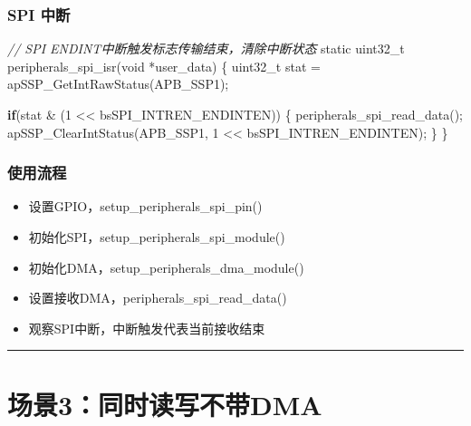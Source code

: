 \documentclass[
  12pt,
]{book}
\newenvironment{Shaded}{\begin{snugshade}}{\end{snugshade}}
\newcommand{\CommentTok}[1]{\textcolor[rgb]{0.56,0.35,0.01}{\textit{#1}}}
\newcommand{\ControlFlowTok}[1]{\textcolor[rgb]{0.13,0.29,0.53}{\textbf{#1}}}
\newcommand{\DataTypeTok}[1]{\textcolor[rgb]{0.13,0.29,0.53}{#1}}
\newcommand{\DecValTok}[1]{\textcolor[rgb]{0.00,0.00,0.81}{#1}}
\newcommand{\NormalTok}[1]{#1}
\providecommand{\tightlist}{%
  \setlength{\itemsep}{0pt}\setlength{\parskip}{0pt}}
\begin{document}
\hypertarget{spi-ux4e2dux65ad-2}{%
\subsubsection{SPI 中断}\label{spi-ux4e2dux65ad-2}}

\begin{Shaded}
\begin{Highlighting}[]
\CommentTok{// SPI ENDINT中断触发标志传输结束，清除中断状态}
\DataTypeTok{static} \DataTypeTok{uint32_t}\NormalTok{ peripherals_spi_isr(}\DataTypeTok{void}\NormalTok{ *user_data)}
\NormalTok{\{}
  \DataTypeTok{uint32_t}\NormalTok{ stat = apSSP_GetIntRawStatus(APB_SSP1);}
  
  \ControlFlowTok{if}\NormalTok{(stat & (}\DecValTok{1}\NormalTok{ << bsSPI_INTREN_ENDINTEN))}
\NormalTok{  \{}
\NormalTok{    peripherals_spi_read_data();}
\NormalTok{    apSSP_ClearIntStatus(APB_SSP1, }\DecValTok{1}\NormalTok{ << bsSPI_INTREN_ENDINTEN);}
\NormalTok{  \}  }
\NormalTok{\}}
\end{Highlighting}
\end{Shaded}

\hypertarget{ux4f7fux7528ux6d41ux7a0b-13}{%
\subsubsection{使用流程}\label{ux4f7fux7528ux6d41ux7a0b-13}}

\begin{itemize}
\tightlist
\item
  设置GPIO，setup\_peripherals\_spi\_pin()
\item
  初始化SPI，setup\_peripherals\_spi\_module()
\item
  初始化DMA，setup\_peripherals\_dma\_module()
\item
  设置接收DMA，peripherals\_spi\_read\_data()
\item
  观察SPI中断，中断触发代表当前接收结束
\end{itemize}

\begin{center}\rule{0.5\linewidth}{0.5pt}\end{center}

\hypertarget{ux573aux666f3ux540cux65f6ux8bfbux5199ux4e0dux5e26dma}{%
\section{场景3：同时读写不带DMA}\label{ux573aux666f3ux540cux65f6ux8bfbux5199ux4e0dux5e26dma}}
\end{document}
